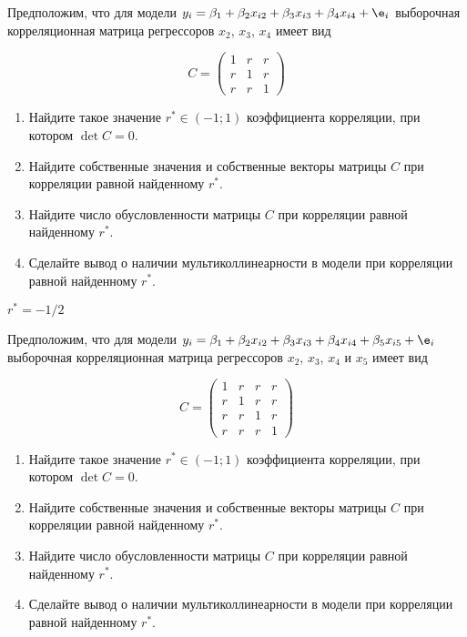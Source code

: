\documentclass[pdftex,11pt,openany]{book}\usepackage[]{graphicx}\usepackage[]{color}
\begin{document}
\begin{problem}
Предположим, что для модели $y_i= \beta_1 + \beta_2 x_{i2} + \beta_3 x_{i3} + \beta_4 x_{i4}  + \e_i$ выборочная корреляционная матрица регрессоров $x_2$, $x_3$, $x_4$ имеет вид

\[
C =
\begin{pmatrix}
1 & r & r  \\
r & 1 & r  \\
r & r & 1   
\end{pmatrix}
\]


\begin{enumerate}
\item Найдите такое значение $r^* \in (-1;1)$ коэффициента корреляции, при котором $\det C = 0$.
\item Найдите собственные значения и собственные векторы матрицы $C$ при корреляции равной найденному $r^*$.
\item Найдите число обусловленности матрицы $C$ при корреляции равной найденному $r^*$.
\item Сделайте вывод о наличии мультиколлинеарности в модели при корреляции равной найденному $r^*$.
\end{enumerate}
\end{problem}

\begin{solution}
$r^* = -1/2$
\end{solution}




\begin{problem}
Предположим, что для модели $y_i= \beta_1 + \beta_2 x_{i2} + \beta_3 x_{i3} + \beta_4 x_{i4} + \beta_5 x_{i5} + \e_i$ выборочная корреляционная матрица регрессоров $x_2$, $x_3$, $x_4$ и $x_5$ имеет вид

\[
C =
\begin{pmatrix}
1 & r & r & r \\
r & 1 & r & r \\
r & r & 1 & r \\
r & r & r & 1 
\end{pmatrix}
\]


\begin{enumerate}
\item Найдите такое значение $r^* \in (-1;1)$ коэффициента корреляции, при котором $\det C = 0$.
\item Найдите собственные значения и собственные векторы матрицы $C$ при корреляции равной найденному $r^*$.
\item Найдите число обусловленности матрицы $C$ при корреляции равной найденному $r^*$.
\item Сделайте вывод о наличии мультиколлинеарности в модели при корреляции равной найденному $r^*$.
\end{enumerate}
\end{problem}
\end{document}
